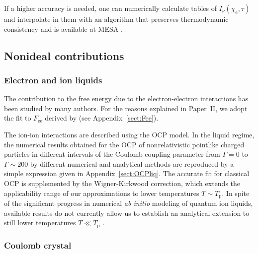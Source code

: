 \documentclass[traditabstract]{aa}
\newcommand{\chie}{\chi_\mathrm{e}}
\newcommand{\Tp}{T_\mathrm{p}}
\begin{document}
If a higher accuracy is needed, one can numerically
calculate tables of $I_\nu(\chie,\tau)$
\citep[e.g.,][]{TimmesArnett} and interpolate in them
with an algorithm that preserves thermodynamic
consistency \citep{TimmesSwesty} and is available at
\textsc{MESA} \citep{MESA}.

\subsection{Nonideal contributions}
\label{sect:nonid}

\subsubsection{Electron and ion liquids}
\label{sect:liq-nm}

The contribution to the free energy due to the
electron-electron interactions has been studied by many authors.
For the reasons explained in Paper~II, we
adopt the fit to $F_\mathrm{ee}$ derived by \citet{IIT}
(see Appendix~\ref{sect:Fee}).

The ion-ion interactions are described using the
OCP model. In the liquid regime, the numerical results
obtained for the OCP of nonrelativistic pointlike charged
particles in different intervals of the Coulomb coupling
parameter from  $\Gamma=0$ to $\Gamma\sim200$ by different
numerical and analytical methods are reproduced by a simple
expression 
given in Appendix~\ref{sect:OCPliq}. The accurate
fit for classical OCP is supplemented by the
Wigner-Kirkwood correction, which extends the
applicability range of our approximations to lower
temperatures $T\sim\Tp$. In spite of the
significant progress in numerical \emph{ab initio} modeling
of quantum ion liquids, available results do not currently
allow us to establish an analytical extension to still lower
temperatures $T\ll\Tp$ \citep[see][for references and
discussion]{CDP02}.

\subsubsection{Coulomb crystal}
\end{document}
